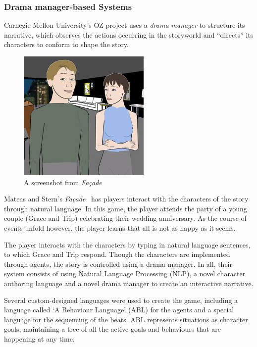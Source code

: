 \documentclass[11pt]{report}
\begin{document}
\subsubsection{Drama manager-based Systems}

Carnegie Mellon University's OZ project \citep{mateas1999oz} uses a \emph{drama manager} to structure its narrative, which observes the actions occurring in the storyworld and ``directs'' its characters to conform to shape the story. 

\begin{figure}[!t]
\centerline{\includegraphics[height=2.5in]{facade.jpg}}
\caption{A screenshot from \emph{Fa\c{c}ade} \citep{mateas2003faccade}}\label{fig:mimesis}
\end{figure}

Mateas and Stern's \emph{Fa\c{c}ade}~\citep{mateas2003faccade} has players interact with the characters of the story through natural language. In this game, the player attends the party of a young couple (Grace and Trip) celebrating their wedding anniversary. As the course of events unfold however, the player learns that all is not as happy as it seems.

The player interacts with the characters by typing in natural language
sentences, to which Grace and Trip respond. Though the characters are
implemented through agents, the story is controlled using a drama manager. In
all, their system consists of using Natural Language Processing (NLP), a novel character authoring language and a novel drama manager to create an interactive narrative.

Several custom-designed languages were used to create the game, including a language called `A Behaviour Language' (ABL) for the agents and a special language for the sequencing of the beats. ABL represents situations as character goals, maintaining a tree of all the active goals and behaviours that are happening at any time.
\end{document}
